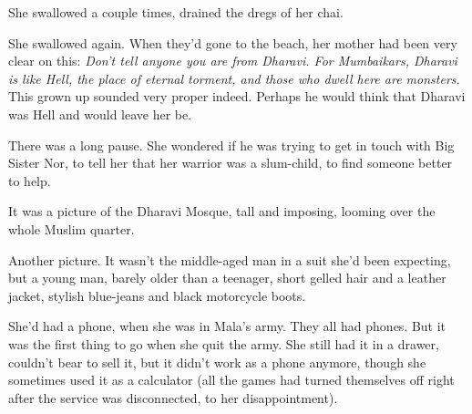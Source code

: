 



She swallowed a couple times, drained the dregs of her chai.



She swallowed again. When they'd gone to the beach, her mother had
been very clear on this:
\emph{Don't tell anyone you are from Dharavi. For Mumbaikars, Dharavi is like Hell, the place of eternal torment, and those who dwell here are monsters.}
This grown up sounded very proper indeed. Perhaps he would think
that Dharavi was Hell and would leave her be.



There was a long pause. She wondered if he was trying to get in
touch with Big Sister Nor, to tell her that her warrior was a
slum-child, to find someone better to help.


It was a picture of the Dharavi Mosque, tall and imposing, looming
over the whole Muslim quarter.



Another picture. It wasn't the middle-aged man in a suit she'd been
expecting, but a young man, barely older than a teenager, short
gelled hair and a leather jacket, stylish blue-jeans and black
motorcycle boots.





She'd had a phone, when she was in Mala's army. They all had
phones. But it was the first thing to go when she quit the army.
She still had it in a drawer, couldn't bear to sell it, but it
didn't work as a phone anymore, though she sometimes used it as a
calculator (all the games had turned themselves off right after the
service was disconnected, to her disappointment).

